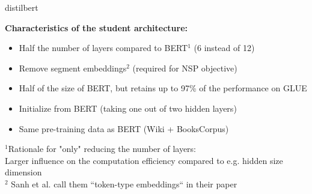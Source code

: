 
\begin{frame}{distilbert}

\vfill

\textbf{Characteristics of the student architecture:}

\begin{itemize}
	\item Half the number of layers compared to BERT$^1$ (6 instead of 12)
	\item Remove segment embeddings$^2$ (required for NSP objective)
 	\item Half of the size of BERT, but retains up to 97\% of the performance on GLUE
	\item Initialize from BERT (taking one out of two hidden layers)
	\item Same pre-training data as BERT (Wiki + BooksCorpus)
\end{itemize}

\vfill

{\footnotesize $^1$Rationale for "only" reducing the number of layers:\\
Larger influence on the computation efficiency compared to e.g. hidden size dimension\\
$^2$ Sanh et al. call them ``token-type embeddings`` in their paper}

\end{frame}


